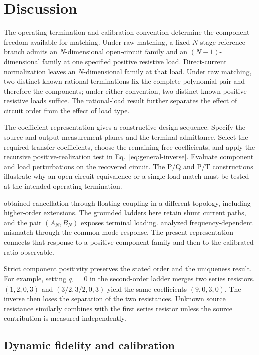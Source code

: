 \section{Discussion}

The operating termination and calibration convention determine the component freedom available for matching. Under raw matching, a fixed $N$-stage reference branch admits an $N$-dimensional open-circuit family and an $(N-1)$-dimensional family at one specified positive resistive load. Direct-current normalization leaves an $N$-dimensional family at that load. Under raw matching, two distinct known rational terminations fix the complete polynomial pair and therefore the components; under either convention, two distinct known positive resistive loads suffice. The rational-load result further separates the effect of circuit order from the effect of load type.

The coefficient representation gives a constructive design sequence. Specify the source and output measurement planes and the terminal admittance. Select the required transfer coefficients, choose the remaining free coefficients, and apply the recursive positive-realization test in Eq.~\eqref{eq:general-inverse}. Evaluate component and load perturbations on the recovered circuit. The P/Q and P/T constructions illustrate why an open-circuit equivalence or a single-load match must be tested at the intended operating termination.

\citet{casas1996basics} obtained cancellation through floating coupling in a different topology, including higher-order extensions. The grounded ladders here retain shunt current paths, and the pair $(A_N,B_N)$ exposes terminal loading. \citet{hornero2021cm} analyzed frequency-dependent mismatch through the common-mode response. The present representation connects that response to a positive component family and then to the calibrated ratio observable.

Strict component positivity preserves the stated order and the uniqueness result. For example, setting $q_1=0$ in the second-order ladder merges two series resistors. $(1,2,0,3)$ and $(3/2,3/2,0,3)$ yield the same coefficients $(9,0,3,0)$. The inverse then loses the separation of the two resistances. Unknown source resistance similarly combines with the first series resistor unless the source contribution is measured independently.

\subsection{Dynamic fidelity and calibration}


